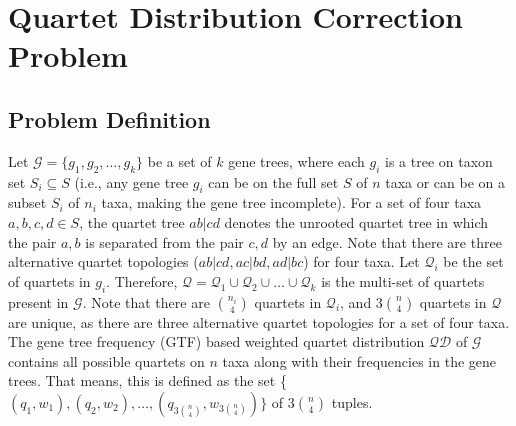 \documentclass[runningheads]{llncs}
\begin{document}



\section{Quartet Distribution Correction Problem}
\subsection{Problem Definition}


Let $\mathcal{G} =  \{g_1, g_2, \ldots, g_k\}$ be a set of $k$ gene trees, where each $g_i$ is a tree on taxon set $S_i \subseteq S$ (i.e., any gene tree $g_i$ can be on the full set $S$ of $n$ taxa or can be on a subset $S_i$ of $n_i$ taxa, making the gene tree incomplete). For a set of four taxa $a,b,c,d \in S$, the quartet tree $ab|cd$ denotes the unrooted quartet tree in which the pair $a, b$ is separated from the pair $c, d$ by an edge. Note that there are three alternative quartet topologies ($ab|cd, ac|bd, ad|bc$) for four taxa.
Let $\mathcal{Q}_i$ be the set of quartets in $g_i$. Therefore, $\mathcal{Q} = \mathcal{Q}_1 \cup \mathcal{Q}_2 \cup \ldots \cup \mathcal{Q}_k$ is the multi-set of quartets present in $\mathcal{G}$. Note that there are $n_i \choose 4$ quartets in $\mathcal{Q}_i$, and $3$$n \choose 4$ quartets in $\mathcal{Q}$ are unique, as there are three alternative quartet topologies for a set of four taxa. %
The gene tree frequency (GTF) based weighted quartet distribution $\mathcal{QD}$ of $\mathcal{G}$ contains all possible quartets on $n$ taxa along with their frequencies in the gene trees. That means, this is defined as the set \{$(q_1,w_1), (q_2,w_2), \ldots, (q_{3{n \choose 4}},w_{3{n \choose 4}})\}$ of $3$$n \choose 4$ tuples. %
\end{document}
